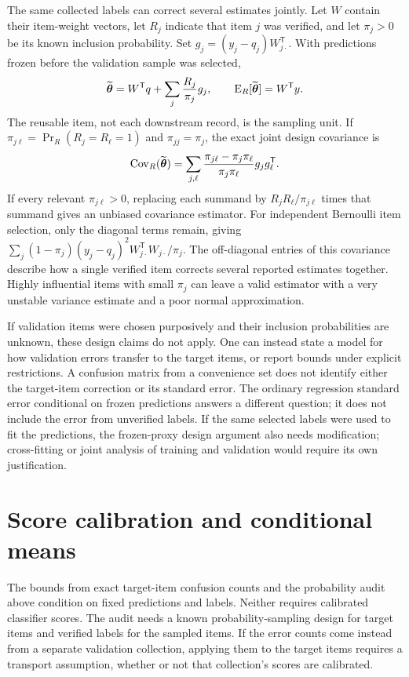 The same collected labels can correct several estimates jointly. Let $W$
contain their item-weight vectors, let $R_j$ indicate that item $j$ was
verified, and let $\pi_j>0$ be its known inclusion probability. Set
$g_j=(y_j-q_j)W_{j\cdot}^{\mathsf T}$. With predictions frozen before the
validation sample was selected,
\begin{equation}\label{eq:jointdirectaudit}
 \widetilde{\boldsymbol\theta}
 =W^{\mathsf T}q+\sum_j\frac{R_j}{\pi_j}g_j,
 \qquad \operatorname{E}_R[\widetilde{\boldsymbol\theta}]=W^{\mathsf T}y.
\end{equation}
The reusable item, not each downstream record, is the sampling unit. If
$\pi_{j\ell}=\Pr_R(R_j=R_\ell=1)$ and $\pi_{jj}=\pi_j$, the exact joint
design covariance is
\begin{equation}\label{eq:jointauditvariance}
 \operatorname{Cov}_R(\widetilde{\boldsymbol\theta})
 =\sum_{j,\ell}
   \frac{\pi_{j\ell}-\pi_j\pi_\ell}{\pi_j\pi_\ell}
   g_jg_\ell^{\mathsf T}.
\end{equation}
If every relevant $\pi_{j\ell}>0$, replacing each summand by
$R_jR_\ell/\pi_{j\ell}$ times that summand gives an unbiased covariance
estimator. For independent Bernoulli item selection, only the diagonal terms
remain, giving
$\sum_j(1-\pi_j)(y_j-q_j)^2
W_{j\cdot}^{\mathsf T}W_{j\cdot}/\pi_j$.
The off-diagonal entries of this covariance describe how a single verified
item corrects several reported estimates together. Highly influential items
with small $\pi_j$ can leave a valid estimator with a very unstable variance
estimate and a poor normal approximation.

If validation items were chosen purposively and their inclusion probabilities
are unknown, these design claims do not apply. One can instead state a model
for how validation errors transfer to the target items, or report bounds under
explicit restrictions. A confusion matrix from a convenience set does not
identify either the target-item correction or its standard error. The
ordinary regression standard error conditional on frozen predictions answers
a different question; it does not include the error from unverified labels.
If the same selected labels were used to fit the predictions, the frozen-proxy
design argument also needs modification; cross-fitting or joint analysis of
training and validation would require its own justification.

\section{Score calibration and conditional means}\label{app:calibration}
The bounds from exact target-item confusion counts and the probability audit
above condition on fixed predictions and labels. Neither requires calibrated
classifier scores. The audit needs a known probability-sampling design for
target items and verified labels for the sampled items. If the
error counts come instead from a separate validation collection, applying them
to the target items requires a transport assumption, whether or not that
collection's scores are calibrated.

